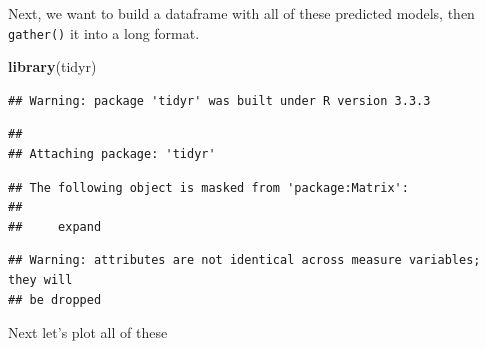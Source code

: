 \documentclass[]{article}
\newenvironment{Shaded}{\begin{snugshade}}{\end{snugshade}}
\newcommand{\KeywordTok}[1]{\textcolor[rgb]{0.13,0.29,0.53}{\textbf{{#1}}}}
\newcommand{\DataTypeTok}[1]{\textcolor[rgb]{0.13,0.29,0.53}{{#1}}}
\newcommand{\StringTok}[1]{\textcolor[rgb]{0.31,0.60,0.02}{{#1}}}
\newcommand{\CommentTok}[1]{\textcolor[rgb]{0.56,0.35,0.01}{\textit{{#1}}}}
\newcommand{\NormalTok}[1]{{#1}}
\begin{document}
Next, we want to build a dataframe with all of these predicted models,
then \texttt{gather()} it into a long format.

\begin{Shaded}
\begin{Highlighting}[]
\KeywordTok{library}\NormalTok{(tidyr)}
\end{Highlighting}
\end{Shaded}

\begin{verbatim}
## Warning: package 'tidyr' was built under R version 3.3.3
\end{verbatim}

\begin{verbatim}
## 
## Attaching package: 'tidyr'
\end{verbatim}

\begin{verbatim}
## The following object is masked from 'package:Matrix':
## 
##     expand
\end{verbatim}

\begin{Shaded}
\end{Shaded}

\begin{verbatim}
## Warning: attributes are not identical across measure variables; they will
## be dropped
\end{verbatim}

Next let's plot all of these
\end{document}
